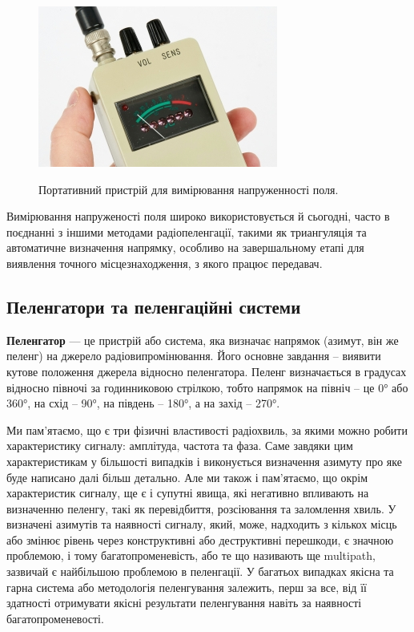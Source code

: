 \documentclass{article}
\begin{document}
\begin{figure}[H]
 	\centering
 	{\includegraphics[width=0.6\linewidth]{images/rdf-small.jpg}}
 	\caption{\label{fig:rds:small}Портативний пристрій для вимірювання напруженності поля.}
\end{figure}
 
Вимірювання напруженості поля широко використовується й сьогодні, часто в поєднанні з іншими методами радіопеленгації, такими як триангуляція та автоматичне визначення напрямку, особливо на завершальному етапі для виявлення точного місцезнаходження, з якого працює передавач.

 
\subsection{Пеленгатори та пеленгаційні системи} 
\textbf{Пеленгатор} --- це пристрій або система, яка визначає напрямок (азимут, він же пеленг) на джерело радіовипромінювання. Його основне завдання -- виявити кутове положення джерела відносно пеленгатора. Пеленг визначається в градусах відносно півночі за годинниковою стрілкою, тобто напрямок на північ -- це 0° або 360°, на схід -- 90°, на південь -- 180°, а на захід -- 270°. 

Ми пам'ятаємо, що є три фізичні властивості радіохвиль, за якими можно робити характеристику сигналу: амплітуда, частота та фаза. Саме завдяки цим характеристикам у більшості випадків і виконується визначення азимуту про яке буде написано далі більш детально. Але ми також і пам'ятаємо, що окрім характеристик сигналу, ще є і супутні явища, які негативно впливають на визначенню пеленгу, такі як перевідбиття, розсіювання та заломлення хвиль. У визначені азимутів та наявності сигналу, який, може, надходить з кількох місць або змінює рівень через конструктивні або деструктивні перешкоди, є значною проблемою, і тому багатопроменевість, або те що називають ще multipath, зазвичай є найбільшою проблемою в пеленгації. У багатьох випадках якісна та гарна система або методологія пеленгування залежить, перш за все, від її здатності отримувати якісні результати пеленгування навіть за наявності  багатопроменевості. 
\end{document}
